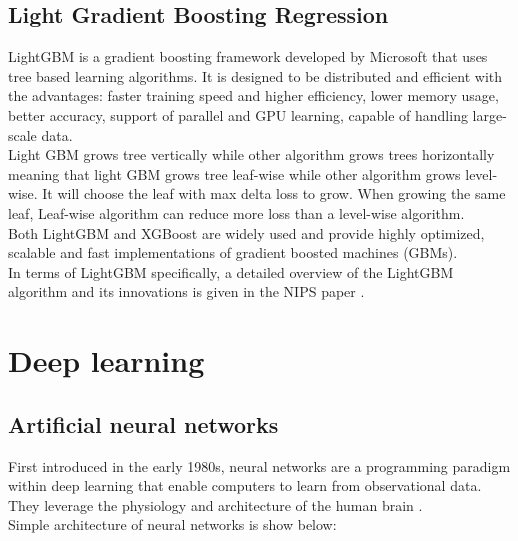 \documentclass[12pt,a4paper]{report}
\begin{document}
\subsection{Light Gradient Boosting Regression}
LightGBM is a gradient boosting framework developed by Microsoft that uses tree based learning algorithms. It is designed to be distributed and efficient with the advantages: faster training speed and higher efficiency, lower memory usage, better accuracy, support of parallel and GPU learning, capable of handling large-scale data.\cite{light}\\
Light GBM grows tree vertically while other algorithm grows trees horizontally meaning that light GBM grows tree leaf-wise while other algorithm grows level-wise. It will choose the leaf with max delta loss to grow. When growing the same leaf, Leaf-wise algorithm can reduce more loss than a level-wise algorithm.\\
Both LightGBM and XGBoost are widely used and provide highly optimized, scalable and fast implementations of gradient boosted machines (GBMs).\\
In terms of LightGBM specifically, a detailed overview of the LightGBM algorithm and its innovations is given in the NIPS paper \cite{light}.



\section{Deep learning}
\subsection{Artificial neural networks}
First introduced in the early 1980s, neural networks are a programming paradigm within deep learning that enable computers to learn from observational data. They leverage the physiology and architecture of the human brain \cite{DO}.\\
Simple architecture of neural networks is show below:
\end{document}

